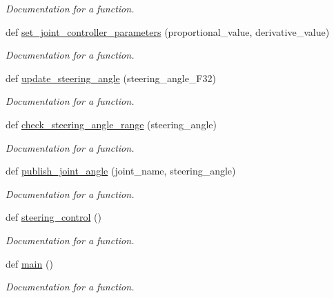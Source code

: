 \begin{DoxyCompactItemize}
\begin{DoxyCompactList}\small\item\em Documentation for a function. \end{DoxyCompactList}\item 
def \mbox{\hyperlink{namespacesteering__simulation_a787fcfa65451a11a9f94afaea6a6e809}{set\+\_\+joint\+\_\+controller\+\_\+parameters}} (proportional\+\_\+value, derivative\+\_\+value)
\begin{DoxyCompactList}\small\item\em Documentation for a function. \end{DoxyCompactList}\item 
def \mbox{\hyperlink{namespacesteering__simulation_ade71f08294031e29a94a9be5cc1f0961}{update\+\_\+steering\+\_\+angle}} (steering\+\_\+angle\+\_\+\+F32)
\begin{DoxyCompactList}\small\item\em Documentation for a function. \end{DoxyCompactList}\item 
def \mbox{\hyperlink{namespacesteering__simulation_abe8ecf85be641d2a56c547e4e27946ba}{check\+\_\+steering\+\_\+angle\+\_\+range}} (steering\+\_\+angle)
\begin{DoxyCompactList}\small\item\em Documentation for a function. \end{DoxyCompactList}\item 
def \mbox{\hyperlink{namespacesteering__simulation_aa303bfd6d5e874d19fda9e678aa4c3d9}{publish\+\_\+joint\+\_\+angle}} (joint\+\_\+name, steering\+\_\+angle)
\begin{DoxyCompactList}\small\item\em Documentation for a function. \end{DoxyCompactList}\item 
def \mbox{\hyperlink{namespacesteering__simulation_a7e6cf517d5eedfae29bc0b05bada6a3e}{steering\+\_\+control}} ()
\begin{DoxyCompactList}\small\item\em Documentation for a function. \end{DoxyCompactList}\item 
def \mbox{\hyperlink{namespacesteering__simulation_af3dec39cd8650ad512084dfda32c577a}{main}} ()
\begin{DoxyCompactList}\small\item\em Documentation for a function. \end{DoxyCompactList}\end{DoxyCompactItemize}
